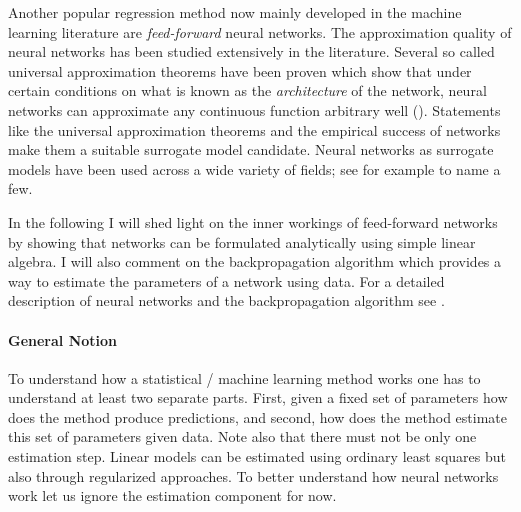 Another popular regression method now mainly developed in the machine learning
literature are \emph{feed-forward} neural networks. The approximation quality of neural
networks has been studied extensively in the literature. Several so called universal
approximation theorems have been proven which show that under certain conditions on what
is known as the \emph{architecture} of the network, neural networks can approximate any
continuous function arbitrary well (\cite{Hornik.1991}). Statements like the universal
approximation theorems and the empirical success of networks make them a suitable
surrogate model candidate. Neural networks as surrogate models have been used across a
wide variety of fields; see for example \cite{Holena.2010, Gang.2019, Tripathy.2018} to
name a few.

In the following I will shed light on the inner workings of feed-forward networks by
showing that networks can be formulated analytically using simple linear algebra. I will
also comment on the backpropagation algorithm which provides a way to estimate the
parameters of a network using data. For a detailed description of neural networks and
the backpropagation algorithm see \cite{Goodfellow.2016, Murphy.2012, Hastie.2008}.

\paragraph{General Notion}

To understand how a statistical / machine learning method works one has to understand at
least two separate parts. First, given a fixed set of parameters how does the method
produce predictions, and second, how does the method estimate this set of parameters
given data. Note also that there must not be only one estimation step. Linear models can
be estimated using ordinary least squares but also through regularized approaches. To
better understand how neural networks work let us ignore the estimation component for
now.

